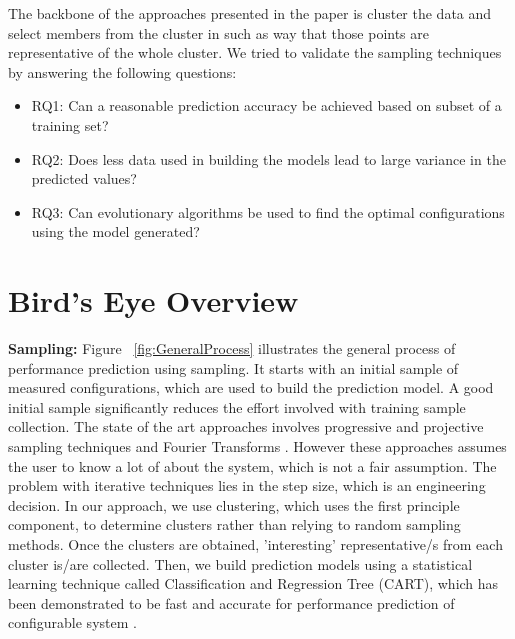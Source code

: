 \documentclass{sig-alternative}
\newcommand{\bi}{\begin{itemize}[leftmargin=0.4cm]}
\newcommand{\ei}{\end{itemize}}
\begin{document}
The backbone of the approaches presented in the paper is cluster the data and select members from the cluster in such as way that those points are representative of the whole cluster. We tried to validate the sampling techniques by answering the following questions:
        \bi
            \item{RQ1: Can a reasonable prediction accuracy be achieved based on subset of a training set?}
            \item{RQ2: Does less data used in building the models lead to large variance in the predicted values?}
            \item{RQ3: Can evolutionary algorithms be used to find the optimal configurations using the model generated?}
        \ei
 
\section{Bird's Eye Overview}


    \textbf{Sampling: } Figure ~\ref{fig:GeneralProcess} illustrates the general process of performance prediction using sampling. It starts with an initial sample of measured configurations, which are used to build the prediction model. A good initial sample significantly reduces the effort involved with training sample collection. The state of the art approaches involves progressive and projective sampling techniques \cite{sarkar2015cost} and Fourier Transforms \cite{zhang2015performance}. However these approaches assumes the user to know a lot of about the system, which is not a fair assumption. The problem with iterative techniques lies in the step size, which is an engineering decision. In our approach, we use clustering, which uses the first principle component, to determine clusters rather than relying to random sampling methods. Once the clusters are obtained, 'interesting' representative/s from each cluster  is/are collected. Then, we build prediction models using a statistical learning technique called Classification and Regression Tree (CART), which has been demonstrated to be fast and accurate for performance prediction of configurable system \cite{guo2013variability}.
    
\end{document}
